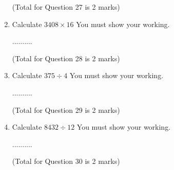 \documentclass{article}
\begin{document}
\begin{enumerate}
\hfill\raggedright (Total for Question 27 is 2 marks) 
\vspace{5pt}
\hline
\vspace{7pt}

\item \quad Calculate \hspace{2cm} \( \displaystyle 3408 \times 16 \) \hspace{2cm} You must show your working.  
\vspace{5pt}

\vspace{150pt} 
\hspace{15cm} ..........  
\vspace{5pt}

\hfill\raggedright (Total for Question 28 is 2 marks) 
\vspace{5pt}
\hline
\vspace{7pt}

\item \quad Calculate \hspace{2cm} \( \displaystyle 375 \div  4 \) \hspace{2cm} You must show your working.  
\vspace{5pt}

\vspace{150pt} 
\hspace{15cm} ..........  
\vspace{5pt}

\hfill\raggedright (Total for Question 29 is 2 marks) 
\vspace{5pt}
\hline
\vspace{7pt}

\item \quad Calculate \hspace{2cm} \( \displaystyle 8432 \div  12 \) \hspace{2cm} You must show your working.  
\vspace{5pt}

\vspace{150pt} 
\hspace{15cm} ..........  
\vspace{5pt}

\hfill\raggedright (Total for Question 30 is 2 marks) 
\vspace{5pt}
\hline
\vspace{7pt}


\end{enumerate}
\end{document}

